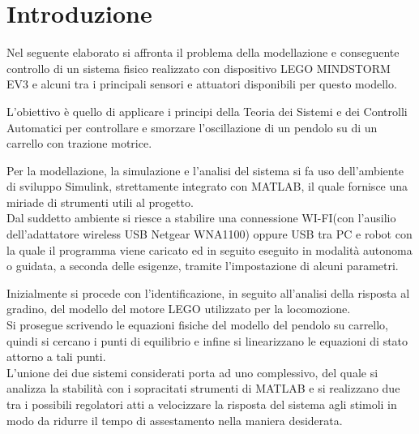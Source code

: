 \chapter{Introduzione}
Nel seguente elaborato si affronta il problema della modellazione e conseguente controllo di un sistema fisico realizzato con dispositivo LEGO MINDSTORM EV3 e alcuni tra i principali sensori e attuatori disponibili per questo modello.

L'obiettivo è quello di applicare i principi della Teoria dei Sistemi e dei Controlli Automatici per controllare e smorzare l'oscillazione di un pendolo su di un carrello con trazione motrice.

Per la modellazione, la simulazione e l'analisi del sistema si fa uso dell'ambiente di sviluppo Simulink, strettamente integrato con MATLAB, il quale fornisce una miriade di strumenti utili al progetto.\\
Dal suddetto ambiente si riesce a stabilire una connessione WI-FI(con l'ausilio dell'adattatore wireless USB Netgear WNA1100) oppure USB tra PC e robot con la quale il programma viene caricato ed in seguito eseguito in modalità autonoma o guidata, a seconda delle esigenze, tramite l'impostazione di alcuni parametri.

Inizialmente si procede con l'identificazione, in seguito all'analisi della risposta al gradino, del modello del motore LEGO utilizzato per la locomozione.\\
Si prosegue scrivendo le equazioni fisiche del modello del pendolo su carrello, quindi si cercano i punti di equilibrio e  infine si linearizzano le equazioni di stato attorno a tali punti.\\
L'unione dei due sistemi considerati porta ad uno complessivo, del quale si analizza la stabilità con i sopracitati strumenti di MATLAB e si realizzano due tra i possibili regolatori atti a velocizzare la risposta del sistema agli stimoli in modo da ridurre il tempo di assestamento nella maniera desiderata.\\



